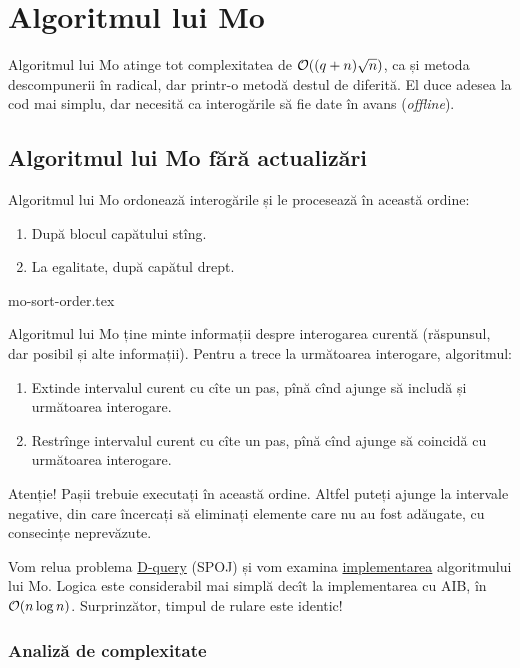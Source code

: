 \documentclass[../main.tex]{subfiles}
\begin{document}
\chapter{Algoritmul lui Mo}
\label{chapter:mo}

Algoritmul lui Mo atinge tot complexitatea de $\mathcal{O}((q + n) \sqrt {n})$, ca și metoda descompunerii în radical, dar printr-o metodă destul de diferită. El duce adesea la cod mai simplu, dar necesită ca interogările să fie date în avans (\textit{offline}).

\section{Algoritmul lui Mo fără actualizări}

Algoritmul lui Mo ordonează interogările și le procesează în această ordine:

\begin{enumerate}
  \item După blocul capătului stîng.
  \item La egalitate, după capătul drept.
\end{enumerate}

{mo-sort-order.tex}

Algoritmul lui Mo ține minte informații despre interogarea curentă (răspunsul, dar posibil și alte informații). Pentru a trece la următoarea interogare, algoritmul:

\begin{enumerate}
  \item Extinde intervalul curent cu cîte un pas, pînă cînd ajunge să includă și următoarea interogare.
  \item Restrînge intervalul curent cu cîte un pas, pînă cînd ajunge să coincidă cu următoarea interogare.
\end{enumerate}

Atenție! Pașii trebuie executați în această ordine. Altfel puteți ajunge la intervale negative, din care încercați să eliminați elemente care nu au fost adăugate, cu consecințe neprevăzute.

Vom relua problema \href{https://www.spoj.com/problems/DQUERY/}{D-query} (SPOJ) și vom examina \href{https://github.com/CatalinFrancu/nerdvana/blob/main/problems/spoj/dquery/cata-mo.cpp}{implementarea} algoritmului lui Mo. Logica este considerabil mai simplă decît la implementarea cu AIB, în $\mathcal{O}(n \log n)$. Surprinzător, timpul de rulare este identic!

\subsection{Analiză de complexitate}
\end{document}
